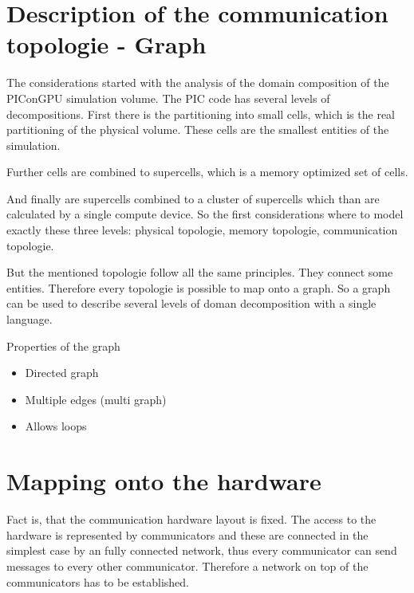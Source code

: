 \section{Description of the communication topologie - Graph}
The considerations started with the analysis of the domain composition
of the PIConGPU simulation volume. The PIC code has several levels of
decompositions. First there is the partitioning into small cells,
which is the real partitioning of the physical volume. These cells are
the smallest entities of the simulation.

Further cells are combined to supercells, which is a memory optimized
set of cells.

And finally are supercells combined to a cluster of supercells which
than are calculated by a single compute device. So the first
considerations where to model exactly these three levels: physical
topologie, memory topologie, communication topologie.

But the mentioned topologie follow all the same principles. They
connect some entities. Therefore every topologie is possible to map
onto a graph.  So a graph can be used to describe several levels of
doman decomposition with a single language.

Properties of the graph
\begin{itemize}
  \item Directed graph
  \item Multiple edges (multi graph)
  \item Allows loops
\end{itemize}

\section{Mapping onto the hardware}

Fact is, that the communication hardware layout is fixed. The access
to the hardware is represented by communicators and these are
connected in the simplest case by an fully connected network, thus
every communicator can send messages to every other
communicator. Therefore a network on top of the communicators has to
be established.

